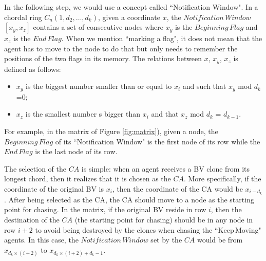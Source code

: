 In the following step, we would use a concept called ``Notification Window". In a chordal ring $C_n(1, d_2, \ldots, d_k)$, given a coordinate $x$, the $Notification\,Window$ $[x_{y},x_{z}]$   contains  a set of consecutive nodes where   $x_{y}$ is   the $Beginning\,Flag$ and   $x_{z}$ is   the $End\,Flag$. When we mention ``marking a flag", it does not mean that the agent has to move to the node to do that but only needs to remember the positions of the two flags in its memory.
The relations between $x$, $x_{y}$, $x_{z}$ is defined   as follows: 
\begin{itemize}
\item $x_{y}$ is the biggest number   smaller than or equal to $x_i$ and  such that   $x_{y}$ mod $d_k$ =$0$; 
\item $x_{z}$ is the smallest number s bigger than $x_i$ and that $x_{z}$ mod $d_k$ = $d_{k-1}$.
\end{itemize} 

For example, in the matrix of  Figure \ref{fig:matrix}), given a node, the $Beginning\,Flag$ of its ``Notification Window" is the first node of its row while the $End\,Flag$ is the last node of its row.

The selection of the $CA$ is simple: when an agent receives a BV clone from its longest chord, then it realizes that it is chosen as the $CA$. More specifically, if the coordinate of the original BV is $x_i$, then the coordinate of the CA would be $x_{i-d_k}$.
After being selected as the CA, the CA should move to a node as the starting point for chasing. In the matrix, if the original BV reside in row $i$, then the destination of the $CA$ (the starting point for chasing) should be in any node in row $i+2$ to avoid being destroyed by the clones when chasing the ``Keep\,Moving" agents. In this case, the $Notification\,Window$ set by the $CA$ would be from $x_{d_k\times(i+2)}$ to $x_{d_k\times(i+2) + d_{k}-1}$.


